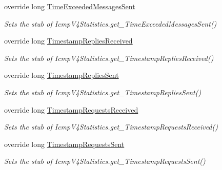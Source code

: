\begin{DoxyCompactItemize}
override long \hyperlink{class_system_1_1_net_1_1_network_information_1_1_fakes_1_1_stub_icmp_v4_statistics_a07453ce2077dff65b240de17eb79441c}{Time\-Exceeded\-Messages\-Sent}
\begin{DoxyCompactList}\small\item\em Sets the stub of Icmp\-V4\-Statistics.\-get\-\_\-\-Time\-Exceeded\-Messages\-Sent()\end{DoxyCompactList}\item 
override long \hyperlink{class_system_1_1_net_1_1_network_information_1_1_fakes_1_1_stub_icmp_v4_statistics_a2c7e810b5b6925541ba2c2c2bcf6958e}{Timestamp\-Replies\-Received}
\begin{DoxyCompactList}\small\item\em Sets the stub of Icmp\-V4\-Statistics.\-get\-\_\-\-Timestamp\-Replies\-Received()\end{DoxyCompactList}\item 
override long \hyperlink{class_system_1_1_net_1_1_network_information_1_1_fakes_1_1_stub_icmp_v4_statistics_af4e87dab17e442efbc3d5f877b96f0a9}{Timestamp\-Replies\-Sent}
\begin{DoxyCompactList}\small\item\em Sets the stub of Icmp\-V4\-Statistics.\-get\-\_\-\-Timestamp\-Replies\-Sent()\end{DoxyCompactList}\item 
override long \hyperlink{class_system_1_1_net_1_1_network_information_1_1_fakes_1_1_stub_icmp_v4_statistics_a3dd5b28cd4297c04bb4a116b13627cab}{Timestamp\-Requests\-Received}
\begin{DoxyCompactList}\small\item\em Sets the stub of Icmp\-V4\-Statistics.\-get\-\_\-\-Timestamp\-Requests\-Received()\end{DoxyCompactList}\item 
override long \hyperlink{class_system_1_1_net_1_1_network_information_1_1_fakes_1_1_stub_icmp_v4_statistics_ac4d695285379a758b1995503f8e5f981}{Timestamp\-Requests\-Sent}
\begin{DoxyCompactList}\small\item\em Sets the stub of Icmp\-V4\-Statistics.\-get\-\_\-\-Timestamp\-Requests\-Sent()\end{DoxyCompactList}\end{DoxyCompactItemize}


